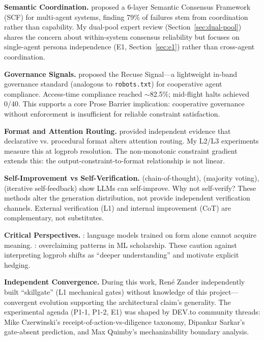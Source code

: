 \documentclass[11pt]{article}
\begin{document}
\textbf{Semantic Coordination.} \citet{acharya2026scf} proposed a 6-layer Semantic
Consensus Framework (SCF) for multi-agent systems, finding 79\% of failures stem
from coordination rather than capability. My dual-pool expert review
(Section~\ref{sec:dual-pool}) shares the concern about within-system consensus
reliability but focuses on single-agent persona independence (E1,
Section~\ref{sec:e1}) rather than cross-agent coordination.

\textbf{Governance Signals.} \citet{munirathinam2026inband} proposed the Recuse
Signal---a lightweight in-band governance standard (analogous to
\texttt{robots.txt}) for cooperative agent compliance. Access-time compliance
reached $\sim$82.5\%; mid-flight halts achieved 0/40. This supports a core
Prose Barrier implication: cooperative governance without enforcement is
insufficient for reliable constraint satisfaction.

\textbf{Format and Attention Routing.} \citet{pendereffect2026} provided
independent evidence that declarative vs. procedural format alters attention
routing. My L2/L3 experiments measure this at logprob resolution. The
non-monotonic constraint gradient extends this: the output-constraint-to-format
relationship is not linear.

\textbf{Self-Improvement vs Self-Verification.} \citet{wei2022cot} (chain-of-thought),
\citet{wang2022selfconsistency} (majority voting), \citet{madaan2023selfrefine}
(iterative self-feedback) show LLMs can self-improve. Why not self-verify? These
methods alter the generation distribution, not provide independent verification
channels. External verification (L1) and internal improvement (CoT) are
complementary, not substitutes.

\textbf{Critical Perspectives.} \citet{bender2020climbing}: language models
trained on form alone cannot acquire meaning. \citet{lipton2018troubling}:
overclaiming patterns in ML scholarship. These caution against interpreting
logprob shifts as ``deeper understanding'' and motivate explicit hedging.

\textbf{Independent Convergence.} During this work, Ren\'{e} Zander independently
built ``skillgate'' (L1 mechanical gates) without knowledge of this project---
convergent evolution supporting the architectural claim's generality. The
experimental agenda (P1-1, P1-2, E1) was shaped by DEV.to community threads:
Mike Czerwinski's receipt-of-action-vs-diligence taxonomy, Dipankar Sarkar's
gate-absent prediction, and Max Quimby's mechanizability boundary analysis.
\end{document}
